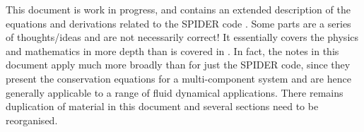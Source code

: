 This document is work in progress, and contains an extended description of the equations and derivations related to the SPIDER code \citep{BSW18}.  Some parts are a series of thoughts/ideas and are not necessarily correct!  It essentially covers the physics and mathematics in more depth than is covered in \cite{ABE93,ABE95,BSW18}.  In fact, the notes in this document apply much more broadly than for just the SPIDER code, since they present the conservation equations for a multi-component system and are hence generally applicable to a range of fluid dynamical applications.  There remains duplication of material in this document and several sections need to be reorganised.